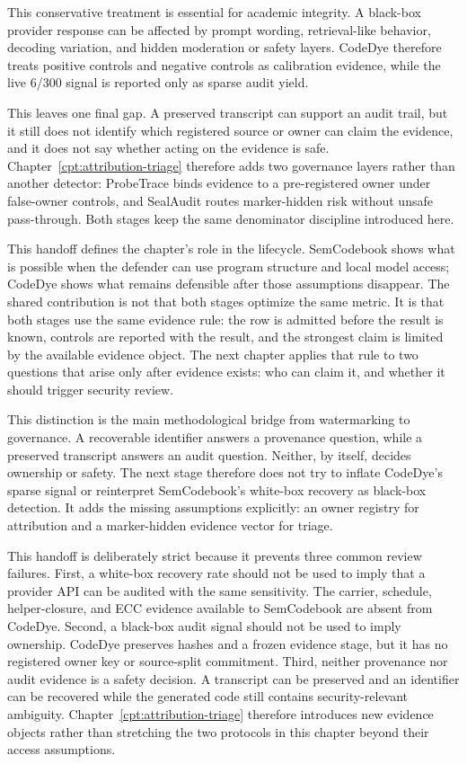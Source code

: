This conservative treatment is essential for academic integrity. A black-box provider response can be affected by prompt wording, retrieval-like behavior, decoding variation, and hidden moderation or safety layers. CodeDye therefore treats positive controls and negative controls as calibration evidence, while the live 6/300 signal is reported only as sparse audit yield.

This leaves one final gap. A preserved transcript can support an audit trail, but it still does not identify which registered source or owner can claim the evidence, and it does not say whether acting on the evidence is safe. Chapter~\ref{cpt:attribution-triage} therefore adds two governance layers rather than another detector: ProbeTrace binds evidence to a pre-registered owner under false-owner controls, and SealAudit routes marker-hidden risk without unsafe pass-through. Both stages keep the same denominator discipline introduced here.

This handoff defines the chapter's role in the lifecycle. SemCodebook shows what is possible when the defender can use program structure and local model access; CodeDye shows what remains defensible after those assumptions disappear. The shared contribution is not that both stages optimize the same metric. It is that both stages use the same evidence rule: the row is admitted before the result is known, controls are reported with the result, and the strongest claim is limited by the available evidence object. The next chapter applies that rule to two questions that arise only after evidence exists: who can claim it, and whether it should trigger security review.

This distinction is the main methodological bridge from watermarking to governance. A recoverable identifier answers a provenance question, while a preserved transcript answers an audit question. Neither, by itself, decides ownership or safety. The next stage therefore does not try to inflate CodeDye's sparse signal or reinterpret SemCodebook's white-box recovery as black-box detection. It adds the missing assumptions explicitly: an owner registry for attribution and a marker-hidden evidence vector for triage.

This handoff is deliberately strict because it prevents three common review failures. First, a white-box recovery rate should not be used to imply that a provider API can be audited with the same sensitivity. The carrier, schedule, helper-closure, and ECC evidence available to SemCodebook are absent from CodeDye. Second, a black-box audit signal should not be used to imply ownership. CodeDye preserves hashes and a frozen evidence stage, but it has no registered owner key or source-split commitment. Third, neither provenance nor audit evidence is a safety decision. A transcript can be preserved and an identifier can be recovered while the generated code still contains security-relevant ambiguity. Chapter~\ref{cpt:attribution-triage} therefore introduces new evidence objects rather than stretching the two protocols in this chapter beyond their access assumptions.

